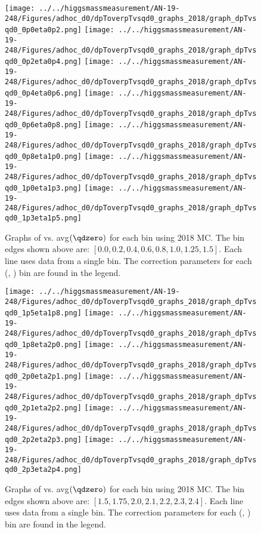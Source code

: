 \newpage
\begin{figure}[!htbp]
    \centering
    { \texttt{[image: ../../higgsmassmeasurement/AN-19-248/Figures/adhoc\_d0/dpToverpTvsqd0\_graphs\_2018/graph\_dpTvsqd0\_0p0eta0p2.png]}}
    { \texttt{[image: ../../higgsmassmeasurement/AN-19-248/Figures/adhoc\_d0/dpToverpTvsqd0\_graphs\_2018/graph\_dpTvsqd0\_0p2eta0p4.png]}}
    { \texttt{[image: ../../higgsmassmeasurement/AN-19-248/Figures/adhoc\_d0/dpToverpTvsqd0\_graphs\_2018/graph\_dpTvsqd0\_0p4eta0p6.png]}}
    { \texttt{[image: ../../higgsmassmeasurement/AN-19-248/Figures/adhoc\_d0/dpToverpTvsqd0\_graphs\_2018/graph\_dpTvsqd0\_0p6eta0p8.png]}}
    { \texttt{[image: ../../higgsmassmeasurement/AN-19-248/Figures/adhoc\_d0/dpToverpTvsqd0\_graphs\_2018/graph\_dpTvsqd0\_0p8eta1p0.png]}}
    { \texttt{[image: ../../higgsmassmeasurement/AN-19-248/Figures/adhoc\_d0/dpToverpTvsqd0\_graphs\_2018/graph\_dpTvsqd0\_1p0eta1p3.png]}}
    { \texttt{[image: ../../higgsmassmeasurement/AN-19-248/Figures/adhoc\_d0/dpToverpTvsqd0\_graphs\_2018/graph\_dpTvsqd0\_1p3eta1p5.png]}}
    \caption{ 
        Graphs of \pTmismeas vs. avg$(\qdzero)$ for each \abseta bin using 2018 MC.
        The \abseta bin edges shown above are: $[0.0, 0.2, 0.4, 0.6, 0.8, 1.0, 1.25, 1.5]$.
        Each line uses data from a single \pT bin. 
        The \pT correction parameters for each (\abseta, \pT) bin are found in the legend.
    }
\end{figure}
\newpage
\begin{figure}[!htbp]
    \centering
    { \texttt{[image: ../../higgsmassmeasurement/AN-19-248/Figures/adhoc\_d0/dpToverpTvsqd0\_graphs\_2018/graph\_dpTvsqd0\_1p5eta1p8.png]}}
    { \texttt{[image: ../../higgsmassmeasurement/AN-19-248/Figures/adhoc\_d0/dpToverpTvsqd0\_graphs\_2018/graph\_dpTvsqd0\_1p8eta2p0.png]}}
    { \texttt{[image: ../../higgsmassmeasurement/AN-19-248/Figures/adhoc\_d0/dpToverpTvsqd0\_graphs\_2018/graph\_dpTvsqd0\_2p0eta2p1.png]}}
    { \texttt{[image: ../../higgsmassmeasurement/AN-19-248/Figures/adhoc\_d0/dpToverpTvsqd0\_graphs\_2018/graph\_dpTvsqd0\_2p1eta2p2.png]}}
    { \texttt{[image: ../../higgsmassmeasurement/AN-19-248/Figures/adhoc\_d0/dpToverpTvsqd0\_graphs\_2018/graph\_dpTvsqd0\_2p2eta2p3.png]}}
    { \texttt{[image: ../../higgsmassmeasurement/AN-19-248/Figures/adhoc\_d0/dpToverpTvsqd0\_graphs\_2018/graph\_dpTvsqd0\_2p3eta2p4.png]}}
    \caption{ 
        Graphs of \pTmismeas vs. avg$(\qdzero)$ for each \abseta bin using 2018 MC.
        The \abseta bin edges shown above are: $[1.5, 1.75, 2.0, 2.1, 2.2, 2.3, 2.4]$.
        Each line uses data from a single \pT bin. 
        The \pT correction parameters for each (\abseta, \pT) bin are found in the legend.
    }
\end{figure}